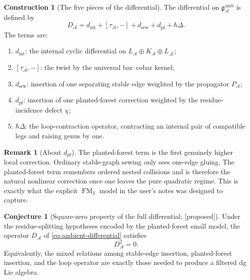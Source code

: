 \documentclass[11pt,oneside]{memoir}
\numberwithin{equation}{chapter}
\theoremstyle{definition}
\newtheorem{construction}[theorem]{Construction}
\newtheorem{conjecture}[theorem]{Conjecture}
\newtheorem{remark}[theorem]{Remark}
\newcommand{\ClaimStatusConjectured}{\textnormal{[proposed]}}
\newcommand{\cA}{\mathcal A}
\newcommand{\fg}{\mathfrak g}
\newcommand{\h}{\hbar}
\DeclareMathOperator{\FM}{FM}
\begin{document}
\begin{construction}[The five pieces of the differential]
\label{constr:five-pieces-differential}
The differential on \(\fg^{\mathrm{amb}}_{\cA}\) is defined by
\begin{equation}
\label{eq:ambient-differential}
D_{\cA}
=
 d_{\mathrm{int}}
 + [\tau_{\cA},-]
 + d_{\mathrm{sew}}
 + d_{\mathrm{pf}}
 + \h\Delta.
\end{equation}
The terms are:
\begin{enumerate}[label=\textup{(\roman*)},leftmargin=2.8em]
\item \(d_{\mathrm{int}}\): the internal cyclic differential on \(L_{\cA}\oplus K_{\cA}\oplus L_{\cA^!}\);
\item \([\tau_{\cA},-]\): the twist by the universal bar--cobar kernel;
\item \(d_{\mathrm{sew}}\): insertion of one separating stable edge weighted by the propagator \(P_{\cA}\);
\item \(d_{\mathrm{pf}}\): insertion of one planted-forest correction weighted by the residue-incidence defect \(\chi\);
\item \(\h\Delta\): the loop-contraction operator, contracting an internal pair of compatible legs and raising genus by one.
\end{enumerate}
\end{construction}

\begin{remark}[About \(d_{\mathrm{pf}}\)]
The planted-forest term is the first genuinely higher local correction.  Ordinary stable-graph sewing only sees one-edge gluing.  The planted-forest term remembers ordered nested collisions and is therefore the natural nonlinear correction once one leaves the pure quadratic regime.  This is exactly what the explicit \(\FM_3\) model in the user's notes was designed to capture.
\end{remark}

\begin{conjecture}[Square-zero property of the full differential; \ClaimStatusConjectured]
\label{conj:differential-square-zero}
Under the residue-splitting hypotheses encoded by the planted-forest small model, the operator \(D_{\cA}\) of \eqref{eq:ambient-differential} satisfies
\[
D_{\cA}^2=0.
\]
Equivalently, the mixed relations among stable-edge insertion, planted-forest insertion, and the loop operator are exactly those needed to produce a filtered dg Lie algebra.
\end{conjecture}
\end{document}
